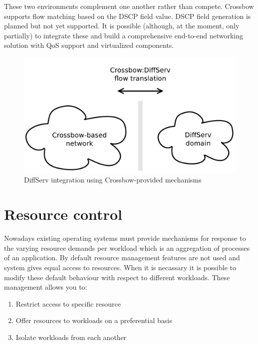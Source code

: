 \documentclass[11pt]{book}
\begin{document}
        These two environments complement one another rather than compete. Crossbow supports flow matching based on the
        DSCP field value. DSCP field generation is planned but not yet supported. It is possible (although, at the
        moment, only partially) to integrate these and build a comprehensive end-to-end networking solution with QoS
        support and virtualized components.

        \begin{figure}[H]
          \begin{center}
            \includegraphics[width=.7\textwidth]{img/solaris/xbow-diffserv.pdf}
          \end{center}

          \caption{DiffServ integration using Crossbow-provided mechanisms}
        \end{figure}


    \section{Resource control}
    \label{sec:sol:res}

      Nowadays existing operating systems must provide mechanisms for response to the varying resource demands
      per workload which is an aggregation of processes of an application. By default resource management
      features are not used and system gives equal access to resources. When it is necassary it is possible to
      modify these default behaviour with respect to different workloads. These management allows you to:

      \begin{enumerate}
        \item Restrict access to specific resource
        \item Offer resources to workloads on a preferential basis
        \item Isolate workloads from each another
      \end{enumerate}
	
\end{document}
